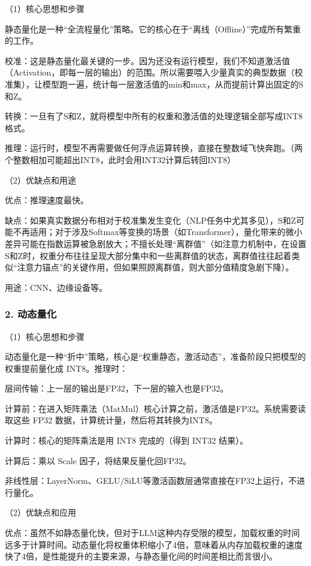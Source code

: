 （1）核心思想和步骤

静态量化是一种``全流程量化''策略。它的核心在于``离线（Offline）''完成所有繁重的工作。

校准：这是静态量化最关键的一步。因为还没有运行模型，我们不知道激活值（Activation，即每一层的输出）的范围。所以需要喂入少量真实的典型数据（校准集），让模型跑一遍，统计每一层激活值的min和max，从而提前计算出固定的S和Z。

转换：一旦有了S和Z，就将模型中所有的权重和激活值的处理逻辑全部写成INT8格式。

推理：运行时，模型不再需要做任何浮点运算转换，直接在整数域飞快奔跑。（两个整数相加可能超出INT8，此时会用INT32计算后转回INT8）

（2）优缺点和用途

优点：推理速度最快。

缺点：如果真实数据分布相对于校准集发生变化（NLP任务中尤其多见），S和Z可能不再适用；对于涉及Softmax等变换的场景（如Transformer），量化带来的微小差异可能在指数运算被急剧放大；不擅长处理``离群值''（如注意力机制中，在设置S和Z时，权重分布往往呈现大部分集中和一些离群值的状态，离群值往往起着类似``注意力锚点''的关键作用，但如果照顾离群值，则大部分值精度急剧下降）。

用途：CNN、边缘设备等。

\hypertarget{ux52a8ux6001ux91cfux5316}{%
\subsubsection{2. 动态量化}\label{ux52a8ux6001ux91cfux5316}}

（1）核心思想和步骤

动态量化是一种``折中''策略，核心是``权重静态，激活动态''，准备阶段只把模型的权重提前量化成 INT8。推理时：

层间传输：上一层的输出是FP32，下一层的输入也是FP32。

计算前：在进入矩阵乘法（MatMul）核心计算之前，激活值是FP32。系统需要读取这些 FP32 数据，计算统计量，然后将其转换为INT8。

计算时：核心的矩阵乘法是用 INT8 完成的（得到 INT32 结果）。

计算后：乘以 Scale 因子，将结果反量化回FP32。

非线性层：LayerNorm、GELU/SiLU等激活函数层通常直接在FP32上运行，不进行量化。

（2）优缺点和应用

优点：虽然不如静态量化快，但对于LLM这种内存受限的模型，加载权重的时间远多于计算时间。动态量化将权重体积缩小了4倍，意味着从内存加载权重的速度快了4倍，是性能提升的主要来源，与静态量化间的时间差相比而言很小。

